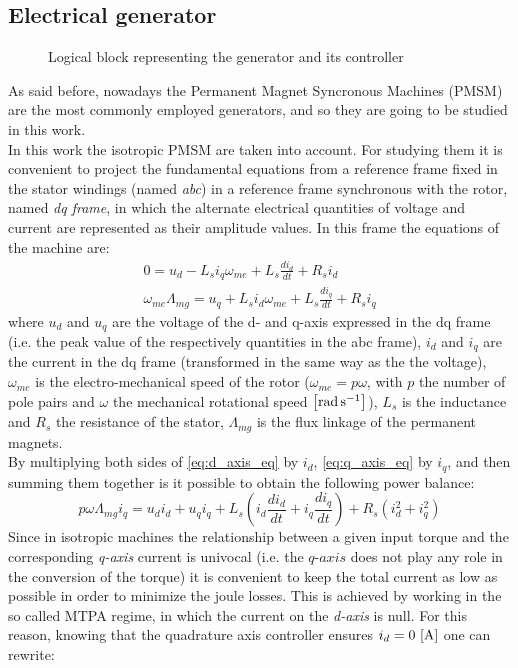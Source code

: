 \subsection{Electrical generator}
\begin{figure}[htb]
  \centering
  
  \caption{Logical block representing the generator and its controller}
  \label{fig:d_generator_block}
\end{figure}

As said before, nowadays the Permanent Magnet Syncronous Machines (PMSM) are the most commonly employed generators, and so they are going to be studied in this work.\\
In this work the isotropic \acrshort{PMSM} are taken into account. For studying them it is convenient to project the fundamental equations from a reference frame fixed in the stator windings (named \textit{abc}) in a reference frame synchronous with the rotor, named \textit{dq frame}, in which the alternate electrical quantities of voltage and current are represented as their amplitude values. 
In this frame the equations of the machine are:
\begin{gather}
  0=u_d-L_{s}i_q\omega_{me}+L_{s}\frac{di_d}{dt}+R_{s}i_d 
  \label{eq:d_axis_eq}\\
  \omega_{me}\Lambda_{mg}=u_q+L_{s}i_d\omega_{me}+L_{s}\frac{di_q}{dt}+R_{s}i_q
  \label{eq:q_axis_eq}
\end{gather}
where $u_d$ and $u_q$ are the voltage of the d- and q-axis expressed in the dq frame (i.e. the peak value of the respectively quantities in the abc frame), $i_d$ and $i_q$ are the current in the dq frame (transformed in the same way as the the voltage), $\omega_{me}$ is the electro-mechanical speed of the rotor ($\omega_{me}=p\omega$, with $p$ the number of pole pairs and $\omega$ the mechanical rotational speed $\left[\si{\radian \per \second}\right]$), $L_{s}$ is the inductance and $R_{s}$ the resistance of the stator, $\Lambda_{mg}$ is the flux linkage of the permanent magnets.\\
By multiplying both sides of \autoref{eq:d_axis_eq} by $i_d$, \autoref{eq:q_axis_eq} by $i_q$, and then summing them together is it possible to obtain the following power balance:
\begin{equation}
  p\omega\Lambda_{mg}i_q=u_di_d + u_qi_q+ L_{s}\left(i_d\frac{di_d}{dt} + i_q\frac{di_q}{dt}\right) + R_{s}(i_d^2 + i_q^2)
  \label{eq:gen_power_balance}
\end{equation}
Since in isotropic machines the relationship between a given input torque and the corresponding \textit{q-axis} current is univocal (i.e. the $\textit{q-axis}$ does not play any role in the conversion of the torque) it is convenient to keep the total current as low as possible in order to minimize the joule losses. This is achieved by working in the so called \acrfull{MTPA} regime, in which the current on the \textit{d-axis} is null. For this reason, knowing that the quadrature axis controller ensures $i_d=0 \, \left[\si{\ampere}\right]$ one can rewrite:
